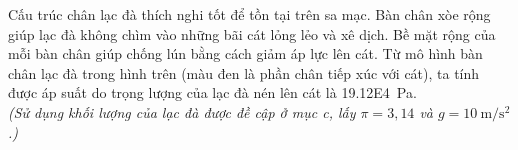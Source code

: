\begin{ex}
	{Cấu trúc chân lạc đà thích nghi tốt để tồn tại trên sa mạc. Bàn chân xòe rộng giúp lạc đà không chìm vào những bãi cát lỏng lẻo và xê dịch. Bề mặt rộng của mỗi bàn chân giúp chống lún bằng cách giảm áp lực lên cát. Từ mô hình bàn chân lạc đà trong hình trên (màu đen là phần chân tiếp xúc với cát), ta tính được áp suất do trọng lượng của lạc đà nén lên cát là \SI{19.12E4}{\pascal}. \\
	\textit{(Sử dụng khối lượng của lạc đà được đề cập ở mục c, lấy $\pi=3,14$ và $g=\SI{10}{\meter/\second^2}$.)}}
\end{ex}
